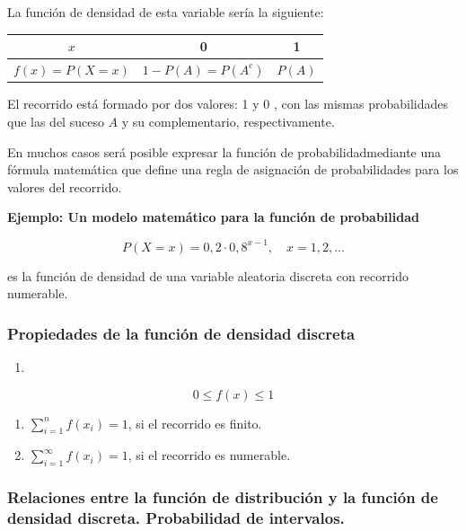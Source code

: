 \documentclass[
]{article}
\providecommand{\tightlist}{%
  \setlength{\itemsep}{0pt}\setlength{\parskip}{0pt}}
\begin{document}
La función de densidad de esta variable sería la siguiente:

\begin{longtable}[]{@{}ccc@{}}
\toprule\noalign{}
\(x\) & 0 & 1 \\
\midrule\noalign{}
\endhead
\bottomrule\noalign{}
\endlastfoot
\(f(x)=P(X=x)\) & \(1-P(A)=P\left(A^{\mathrm{c}}\right)\) & \(P(A)\) \\
\end{longtable}

El recorrido está formado por dos valores: 1 y 0 , con las mismas
probabilidades que las del suceso \(A\) y su complementario,
respectivamente.

En muchos casos será posible expresar la función de probabilidadmediante una fórmula
matemática que define una regla de asignación de probabilidades para los
valores del recorrido.

\textbf{Ejemplo: Un modelo matemático para la función de probabilidad}

\[
P(X=x)=0,2 \cdot 0,8^{x-1}, \quad x=1,2, \ldots
\]

es la función de densidad de una variable aleatoria discreta con
recorrido numerable.

\subsubsection{Propiedades de la función de densidad discreta}\label{propiedades-de-la-funciuxf3n-de-densidad-discreta}

\begin{enumerate}
\def\labelenumi{\arabic{enumi}.}
\tightlist
\item
\end{enumerate}

\[
0 \leq f(x) \leq 1
\]

\begin{enumerate}
\def\labelenumi{\arabic{enumi}.}
\setcounter{enumi}{1}
\tightlist
\item
  \(\sum_{i=1}^{n} f\left(x_{i}\right)=1\), si el recorrido es finito.
\item
  \(\sum_{i=1}^{\infty} f\left(x_{i}\right)=1\), si el recorrido es
  numerable.
\end{enumerate}

\subsubsection{\texorpdfstring{Relaciones entre la función de distribución y la función de densidad discreta. Probabilidad de intervalos.}{Relaciones entre la función de distribución y la función de densidad discreta.   Probabilidad de intervalos.}}\label{relaciones-entre-la-funciuxf3n-de-distribuciuxf3n-y-la-funciuxf3n-de-densidad-discreta.-probabilidad-de-intervalos.}
\end{document}
